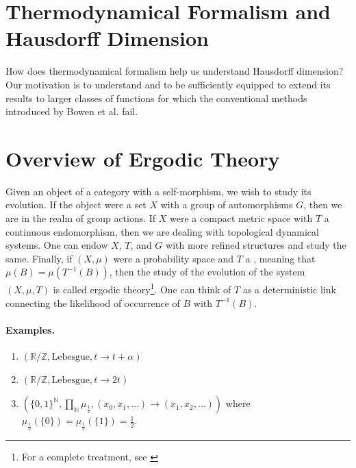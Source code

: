 \documentclass[11pt,a4paper]{article}
\begin{document}
\section*{Thermodynamical Formalism and Hausdorff Dimension}

How does thermodynamical formalism help us understand Hausdorff dimension?
Our motivation is to understand \cite{denker1991hausdorff} and to be
sufficiently equipped to extend its results to larger classes of functions
for which the conventional methods introduced by Bowen et al. fail.
\section{Overview of Ergodic Theory}
Given an object of a category with a self-morphism, we wish to study its
evolution. If the object were a set $X$ with a group of automorphisms $G$,
then we are in the realm of group actions. If $X$ were a compact metric space
with $T$ a continuous endomorphism, then we are dealing with topological
dynamical systems. One can endow $X$, $T$, and $G$ with more refined
structures and study the same. Finally, if $(X,\mu)$ were a probability
space and $T$ a , meaning that
$\mu(B)=\mu(T^{-1}(B))$, then the study of the evolution of the system
$(X,\mu,T)$ is called ergodic theory\footnote{For a complete treatment, see
\cite{einsiedler2011ergodic}}. One can think of $T$ as a deterministic link
connecting the likelihood of occurrence of $B$ with $T^{-1}(B)$.

\paragraph{Examples.}
\begin{enumerate}
    \item $(\mathbb{R}/\mathbb{Z}, \text{Lebesgue}, t\rightarrow t+\alpha)$
    \item $(\mathbb{R}/\mathbb{Z}, \text{Lebesgue}, t\rightarrow 2t)$
    \item $(\{0,1\}^{\mathbb{N}}, \prod_{\mathbb{N}}\mu_{\frac{1}{2}}, (x_0, x_1, \ldots) \rightarrow (x_1, x_2, \ldots))$ where $\mu_{\frac{1}{2}}(\{0\}) = \mu_{\frac{1}{2}}(\{1\}) = \frac{1}{2}$.
\end{enumerate}
\end{document}
